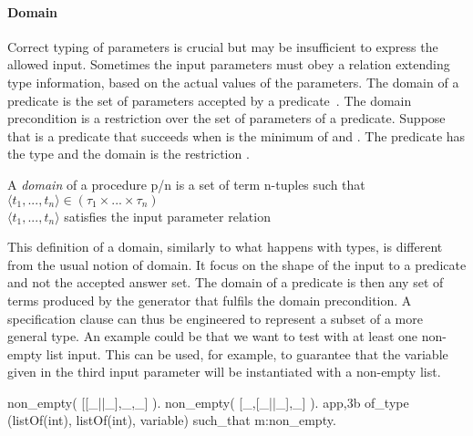\paragraph{\bf Domain}

Correct typing of parameters is crucial but may be insufficient to
express the allowed input.
%
Sometimes the input parameters must obey a relation extending type information,
based on the actual values of the parameters.
%
The domain of a predicate is the set of parameters accepted by a
predicate~\cite{Deville1990logprog}.
%
The domain precondition is a restriction over the set of parameters of a
predicate.
%
Suppose that  is a predicate that succeeds when
 is the minimum of  and .
%
The predicate has the type  and the domain is the
restriction .


\begin{definition}
\label{def:domain}
A {\em domain} of a procedure p/n is a set of term
n-tuples such that\\
\qquad $\langle t_1,...,t_n \rangle \in (\tau_1 \times ... \times
\tau_n)$\\
\qquad $\langle t_1,...,t_n \rangle$ satisfies the input parameter relation
\end{definition}


This definition of a domain, similarly to what happens with types, is
different from the usual notion of domain.
%
It focus on the shape of the input to a predicate and not the accepted
answer set.
%
The \plqc{} domain of a predicate is then any set of terms produced by
the generator that fulfils the domain precondition.
%
%
A specification clause can thus be engineered to represent a subset of
a more general type.
%
An example could be that we want to test  with at least one
non-empty list input.
%
This can be used, for example, to guarantee that the variable given in
the third input parameter will be instantiated with a non-empty list.
\begin{yapcode}
 non_empty( [[_||_],_,_] ).
 non_empty( [_,[_||_],_] ).
 {app,3b} of_type (listOf(int), listOf(int), variable)
    such_that m:non_empty.
\end{yapcode}



